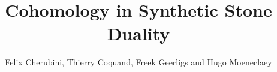 \documentclass{../util/zariski}
\title{Cohomology in Synthetic Stone Duality}
\begin{document}
\author{Felix Cherubini, Thierry Coquand, Freek Geerligs and Hugo Moeneclaey}

\maketitle


\begin{abstract}
  
\end{abstract}


\end{document}
